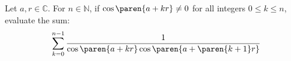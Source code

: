 Let $a, r \in \mathbb{C}$.
For $n \in \mathbb{N}$,
if $\cos\paren{a + kr} \neq 0$ for all integers $0 \leq k \leq n$,
evaluate the sum:
\begin{equation*}
  \sum\limits_{k = 0}^{n - 1} {\frac{1}{\cos\paren{a + k r} \cos\paren{a + \paren{k+1} r}}}
\end{equation*}

